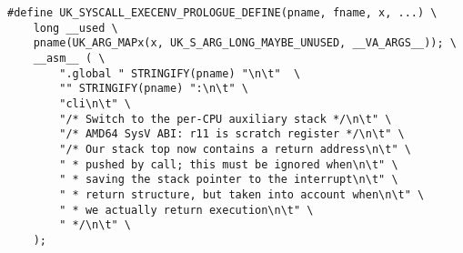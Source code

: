 \begin{lstlisting}
#define UK_SYSCALL_EXECENV_PROLOGUE_DEFINE(pname, fname, x, ...) \
	long __used \
	pname(UK_ARG_MAPx(x, UK_S_ARG_LONG_MAYBE_UNUSED, __VA_ARGS__));	\
	__asm__ ( \
		".global " STRINGIFY(pname) "\n\t"	\
		"" STRINGIFY(pname) ":\n\t"	\
		"cli\n\t" \
		"/* Switch to the per-CPU auxiliary stack */\n\t" \
		"/* AMD64 SysV ABI: r11 is scratch register */\n\t"	\
		"/* Our stack top now contains a return address\n\t" \
		" * pushed by call; this must be ignored when\n\t" \
		" * saving the stack pointer to the interrupt\n\t" \
		" * return structure, but taken into account when\n\t" \
		" * we actually return execution\n\t" \
		" */\n\t" \
    );   
\end{lstlisting}

